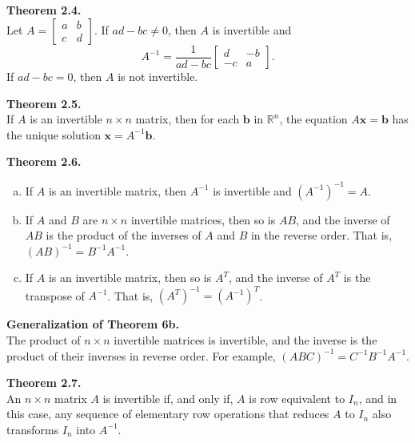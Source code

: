 \documentclass[10pt]{book}
\newenvironment{boxthm}{\begin{mdframed}[backgroundcolor=gray!30,nobreak=true]}{\end{mdframed}}
\newcommand{\R}{\mathbb{R}}
\newcommand{\vect}[1]{\ensuremath{\boldsymbol{\mathbf{#1}}}}
\newcommand{\Axb}{A\vect{x}=\vect{b}}
\begin{document}
\begin{boxthm}
	\textbf{Theorem 2.4.} \\
	Let $A=\begin{bmatrix}a&b\\c&d\end{bmatrix}$. If $ad-bc\neq 0$, then $A$ is invertible and
	$$ A^{-1} = \frac{1}{ad-bc}\begin{bmatrix}d&-b\\-c&a\end{bmatrix}. $$
	If $ad-bc=0$, then $A$ is not invertible.
\end{boxthm}
\begin{boxthm}
	\textbf{Theorem 2.5.} \\
	If $A$ is an invertible $n\times n$ matrix, then for each $\vect{b}$ in $\R^n$, the equation $\Axb$ has the unique solution $\vect{x}=A^{-1}\vect{b}$.
\end{boxthm}
\begin{boxthm}
	\textbf{Theorem 2.6.}
	\begin{enumerate}[(a)]
		\item If $A$ is an invertible matrix, then $A^{-1}$ is invertible and $\left(A^{-1}\right)^{-1} = A$.
		\item If $A$ and $B$ are $n\times n$ invertible matrices, then so is $AB$, and the inverse of $AB$ is the product of the inverses of $A$ and $B$ in the reverse order. That is,
		$(AB)^{-1}=B^{-1}A^{-1}$.
		\item If $A$ is an invertible matrix, then so is $A^T$, and the inverse of $A^T$ is the transpose of $A^{-1}$. That is, $\left(A^T\right)^{-1}=\left(A^{-1}\right)^T$.
	\end{enumerate}
\end{boxthm}
\begin{boxthm}
	\textbf{Generalization of Theorem 6b.} \\
	The product of $n\times n$ invertible matrices is invertible, and the inverse is the product of their inverses in reverse order.
	For example, $\left(ABC\right)^{-1}=C^{-1}B^{-1}A^{-1}$.
\end{boxthm}
\begin{boxthm}
	\textbf{Theorem 2.7.} \\
	An $n\times n$ matrix $A$ is invertible if, and only if, $A$ is row equivalent to $I_n$, and in this case, any sequence of elementary row operations that reduces $A$ to $I_n$ also transforms $I_n$ into $A^{-1}$.
\end{boxthm}
\end{document}
